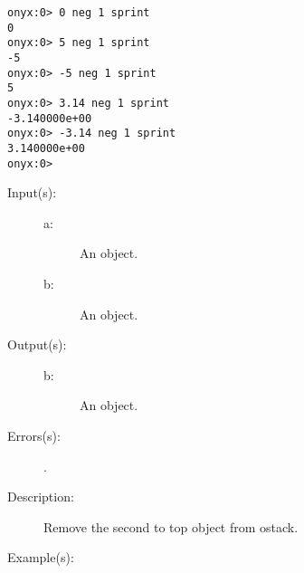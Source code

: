 \begin{description}
\begin{description}
\begin{verbatim}
onyx:0> 0 neg 1 sprint
0
onyx:0> 5 neg 1 sprint
-5
onyx:0> -5 neg 1 sprint
5
onyx:0> 3.14 neg 1 sprint
-3.140000e+00
onyx:0> -3.14 neg 1 sprint
3.140000e+00
onyx:0>
		\end{verbatim}
	\end{description}
\label{systemdict:nip}
\item[{\onyxop{a b}{nip}{b}}: ]
	\begin{description}\item[]
	\item[Input(s): ]
		\begin{description}\item[]
		\item[a: ]
			An object.
		\item[b: ]
			An object.
		\end{description}
	\item[Output(s): ]
		\begin{description}\item[]
		\item[b: ]
			An object.
		\end{description}
	\item[Errors(s): ]
		\begin{description}\item[]
		\item[.]
		\end{description}
	\item[Description: ]
		Remove the second to top object from ostack.
	\item[Example(s): ]\begin{verbatim}


\end{verbatim}
\end{description}
\end{description}
